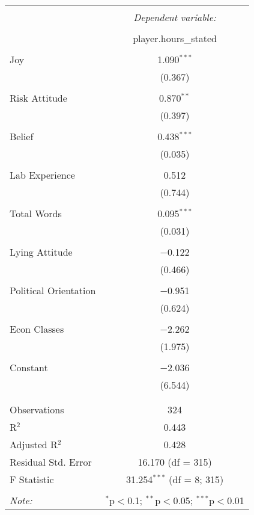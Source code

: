 
\begin{table}[!htbp] \centering 
  \caption{} 
  \label{} 
\begin{tabular}{@{\extracolsep{5pt}}lc} 
\\[-1.8ex]\hline 
\hline \\[-1.8ex] 
 & \multicolumn{1}{c}{\textit{Dependent variable:}} \\ 
\cline{2-2} 
\\[-1.8ex] & player.hours\_stated \\ 
\hline \\[-1.8ex] 
 Joy & 1.090$^{***}$ \\ 
  & (0.367) \\ 
  & \\ 
 Risk Attitude & 0.870$^{**}$ \\ 
  & (0.397) \\ 
  & \\ 
 Belief & 0.438$^{***}$ \\ 
  & (0.035) \\ 
  & \\ 
 Lab Experience & 0.512 \\ 
  & (0.744) \\ 
  & \\ 
 Total Words & 0.095$^{***}$ \\ 
  & (0.031) \\ 
  & \\ 
 Lying Attitude & $-$0.122 \\ 
  & (0.466) \\ 
  & \\ 
 Political Orientation & $-$0.951 \\ 
  & (0.624) \\ 
  & \\ 
 Econ Classes & $-$2.262 \\ 
  & (1.975) \\ 
  & \\ 
 Constant & $-$2.036 \\ 
  & (6.544) \\ 
  & \\ 
\hline \\[-1.8ex] 
Observations & 324 \\ 
R$^{2}$ & 0.443 \\ 
Adjusted R$^{2}$ & 0.428 \\ 
Residual Std. Error & 16.170 (df = 315) \\ 
F Statistic & 31.254$^{***}$ (df = 8; 315) \\ 
\hline 
\hline \\[-1.8ex] 
\textit{Note:}  & \multicolumn{1}{r}{$^{*}$p$<$0.1; $^{**}$p$<$0.05; $^{***}$p$<$0.01} \\ 
\end{tabular} 
\end{table} 
